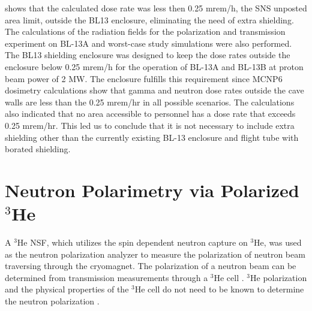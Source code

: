  shows that the calculated dose rate was less then 0.25 mrem/h, the SNS unposted area limit, outside the BL13 enclosure, eliminating the need of extra shielding. The calculations of the radiation fields for the polarization and transmission experiment on BL-13A and worst-case study simulations were also performed. The BL13 shielding enclosure was designed to keep the dose rates outside the enclosure below 0.25 mrem/h for the operation of BL-13A and BL-13B at proton beam power of 2 MW. The enclosure fulfills this requirement since MCNP6 dosimetry calculations show that gamma and neutron dose rates outside the cave walls are less than the 0.25 mrem/hr in all possible scenarios. The calculations also indicated that no area accessible to personnel has a dose rate that exceeds 0.25 mrem/hr. This led us to conclude that it is not necessary to include extra shielding other than the currently existing BL-13 enclosure and flight tube with borated shielding.

\section{Neutron Polarimetry via Polarized ${^3}$He}
\label{sec:PT}

A $^3$He NSF, which utilizes the spin dependent neutron capture on $^3$He, was used as the neutron polarization analyzer to measure the polarization of neutron beam traversing through the cryomagnet. The polarization of a neutron beam can be determined from transmission measurements through a $^3$He cell \cite{Greene1995, Musgrave2018}. $^3$He polarization and the physical properties of the $^3$He cell do not need to be known to determine the neutron polarization \cite{Greene1995}.

